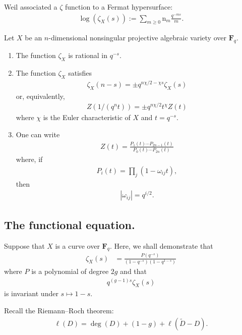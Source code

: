 \documentclass [11 pt, oneside] {article}
\begin{document}
Weil associated a $\zeta$ function to a Fermat hypersurface:
\begin{align*}
	\log (\zeta_X(s)) := \sum_{m\ge 0}^{} \mathup{n}_m \frac{q^{-ms}}{m}.
\end{align*}
\begin{theorem}\label{Weil conjectures}\text{}
	Let $X$ be an $n$-dimensional nonsingular projective algebraic variety over $\mathbf{F}_{q}$.
\begin{enumerate}
	\item The function $\zeta_X$ is rational in $q^{-s}$.
	\item The function $\zeta_X$ satisfies
		 \begin{align*}
			 \zeta_X(n-s) = \pm q^{n\chi/2 - \chi s} \zeta_X (s)
		 \end{align*}
		 or, equivalently,
		 \begin{align*}
		 	Z(1/(q^nt)) = \pm q^{n\chi/2} t^{\chi} Z(t)
		 \end{align*}
		 where $\chi$ is the Euler characteristic of $X$ and $t= q^{-s}$.
	\item One can write
		\begin{align*}
			Z(t) = \frac{P_1(t)\cdots P_{2n-1} (t)}{P_0(t)\cdots P_{2n} (t)}
		\end{align*}
		where, if
		\begin{align*}
			P_i(t) = \prod_j  (1-\omega_{ij}t),
		\end{align*}
		then
		\begin{align*}
			\left\lvert \omega_{ij} \right\rvert = q^{i/2}.
		\end{align*}
\end{enumerate}
\end{theorem}

\subsection{The functional equation.}
Suppose that $X$ is a curve over $\mathbf{F}_{q}$. Here, we shall demonstrate that
\begin{align*}
	\zeta_{X}(s) &=  \frac{P(q^{-s})}{(1-q^{-s}) (1-q^{1-s})}
\end{align*}
where $P$ is a polynomial of degree $2g$ and that
\begin{align*}
	q^{(g-1) s}\zeta_{X}(s)
\end{align*}
is invariant under $s\longmapsto 1-s$.

Recall the Riemann--Roch theorem:
\begin{align*}
	\ell(D) = \deg (D) +  (1-g) + \ell (\tilde D- D).
\end{align*}
\end{document}
